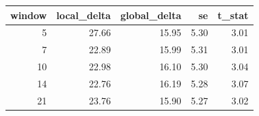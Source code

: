 \begin{tabular}{rrrrr}
\toprule
window & local\_delta & global\_delta & se & t\_stat \\
\midrule
5 & 27.66 & 15.95 & 5.30 & 3.01 \\
7 & 22.89 & 15.99 & 5.31 & 3.01 \\
10 & 22.98 & 16.10 & 5.30 & 3.04 \\
14 & 22.76 & 16.19 & 5.28 & 3.07 \\
21 & 23.76 & 15.90 & 5.27 & 3.02 \\
\bottomrule
\end{tabular}
